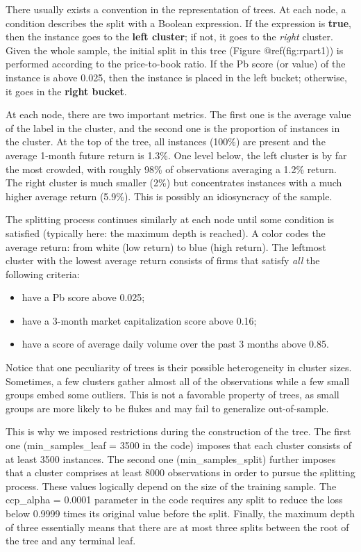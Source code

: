 There usually exists a convention in the representation of trees. At each node, a condition describes the split with a Boolean expression. If the expression is \textbf{true}, then the instance goes to the \textbf{left cluster}; if not, it goes to the \textit{right} cluster. Given the whole sample, the initial split in this tree (Figure @ref(fig:rpart1)) is performed according to the price-to-book ratio. If the Pb score (or value) of the instance is above 0.025, then the instance is placed in the left bucket; otherwise, it goes in the \textbf{right bucket}.

At each node, there are two important metrics. The first one is the average value of the label in the cluster, and the second one is the proportion of instances in the cluster. At the top of the tree, all instances (100\%) are present and the average 1-month future return is 1.3\%. One level below, the left cluster is by far the most crowded, with roughly 98\% of observations averaging a 1.2\% return. The right cluster is much smaller (2\%) but concentrates instances with a much higher average return (5.9\%). This is possibly an idiosyncracy of the sample.

The splitting process continues similarly at each node until some condition is satisfied (typically here: the maximum depth is reached). A color codes the average return: from white (low return) to blue (high return). The leftmost cluster with the lowest average return consists of firms that satisfy \textit{all} the following criteria:

\begin{itemize}
\item have a Pb score above 0.025;
\item have a 3-month market capitalization score above 0.16;
\item have a score of average daily volume over the past 3 months above 0.85.
\end{itemize}

Notice that one peculiarity of trees is their possible heterogeneity in cluster sizes. Sometimes, a few clusters gather almost all of the observations while a few small groups embed some outliers. This is not a favorable property of trees, as small groups are more likely to be flukes and may fail to generalize out-of-sample.

This is why we imposed restrictions during the construction of the tree. The first one (min\_samples\_leaf = 3500 in the code) imposes that each cluster consists of at least 3500 instances. The second one (min\_samples\_split) further imposes that a cluster comprises at least 8000 observations in order to pursue the splitting process. These values logically depend on the size of the training sample. The ccp\_alpha = 0.0001 parameter in the code requires any split to reduce the loss below 0.9999 times its original value before the split. Finally, the maximum depth of three essentially means that there are at most three splits between the root of the tree and any terminal leaf.

